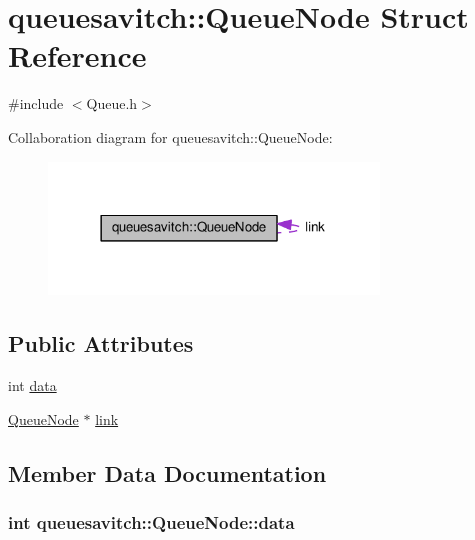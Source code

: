 \hypertarget{structqueuesavitch_1_1QueueNode}{}\section{queuesavitch\+:\+:Queue\+Node Struct Reference}
\label{structqueuesavitch_1_1QueueNode}


{\ttfamily \#include $<$Queue.\+h$>$}



Collaboration diagram for queuesavitch\+:\+:Queue\+Node\+:
\nopagebreak
\begin{figure}[H]
\begin{center}
\leavevmode
\includegraphics[width=249pt]{structqueuesavitch_1_1QueueNode__coll__graph}
\end{center}
\end{figure}
\subsection*{Public Attributes}
\begin{DoxyCompactItemize}
\item 
int \hyperlink{structqueuesavitch_1_1QueueNode_a4fd17a591c8510ed1118d3c4cb67b320}{data}
\item 
\hyperlink{structqueuesavitch_1_1QueueNode}{Queue\+Node} $\ast$ \hyperlink{structqueuesavitch_1_1QueueNode_add6ebeca47fc7ab55c99a33827cb68c4}{link}
\end{DoxyCompactItemize}


\subsection{Member Data Documentation}
\subsubsection[{\texorpdfstring{data}{data}}]{\setlength{\rightskip}{0pt plus 5cm}int queuesavitch\+::\+Queue\+Node\+::data}\hypertarget{structqueuesavitch_1_1QueueNode_a4fd17a591c8510ed1118d3c4cb67b320}{}\label{structqueuesavitch_1_1QueueNode_a4fd17a591c8510ed1118d3c4cb67b320}
